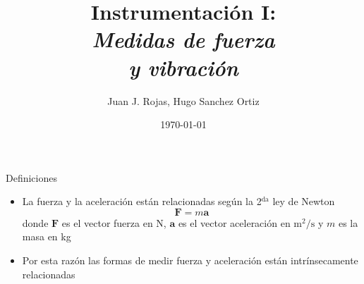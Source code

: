 \documentclass[aspectratio=169]{beamer}
\title{Instrumentación I: \\ \emph{Medidas de fuerza}\\ \emph{y vibración}}
\author{
    Juan J. Rojas, Hugo Sanchez Ortiz
}
\institute{Instituto Tecnológico de Costa Rica}
\date{\today}
\begin{document}

\maketitle

\newcommand{\blackandwhite}{white} %

\begin{frame}{Definiciones}
    \begin{itemize}
        \item La fuerza y la aceleración están relacionadas según la 2$^\mathrm{da}$ ley de Newton
        \begin{equation*}
            \mathbf{F} = m\mathbf{a}
        \end{equation*}
        donde $\mathbf{F}$ es el vector fuerza en \si{\newton}, $\mathbf{a}$ es el vector aceleración en $\si{\meter\squared/\second}$ y  $m$ es la masa en \si{\kilo\gram}
        \item Por esta razón las formas de medir fuerza y aceleración están intrínsecamente relacionadas
    \end{itemize}
\end{frame}
\end{document}
